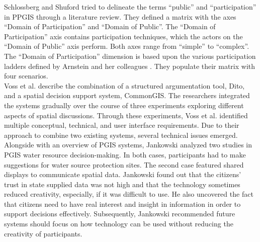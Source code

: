 Schlossberg and Shuford \cite{Schlossberg2005_PPGIS} tried to delineate the terms ``public'' and ``participation'' in PPGIS through a literature review. They defined a matrix with the axes ``Domain of Participation'' and ``Domain of Public''. The ``Domain of Participation'' axis contains participation techniques, which the actors on the ``Domain of Public'' axis perform. Both axes range from ``simple'' to ``complex''. The ``Domain of Participation'' dimension is based upon the various participation ladders defined by Arnstein and her colleagues \cite{Arnstein1969_citizen_participation,Wiedemann1993355,Connor1988_new_ladder}. They populate their matrix with four scenarios.\\
Voss et al. \cite{Voss2004_Evolution_PGIS} describe the combination of a structured argumentation tool, Dito, and a spatial decision support system, CommonGIS. The researchers integrated the systems gradually over the course of three experiments exploring different aspects of spatial discussions. Through these experiments, Voss et al. identified multiple conceptual, technical, and user interface requirements. Due to their approach to combine two existing systems, several technical issues emerged.\\
Alongside with an overview of PGIS systems, Jankowski \cite{Jankowski2005_community_based_pgis} analyzed two studies in PGIS water resource decision-making. In both cases, participants had to make suggestions for water source protection sites. The second case featured shared displays to communicate spatial data. Jankowski found out that the citizens' trust in state supplied data was not high and that the technology sometimes reduced creativity, especially, if it was difficult to use. He also uncovered the fact that citizens need to have real interest and insight in information in order to support decisions effectively. Subsequently, Jankowski recommended future systems should focus on how technology can be used without reducing the creativity of participants.

